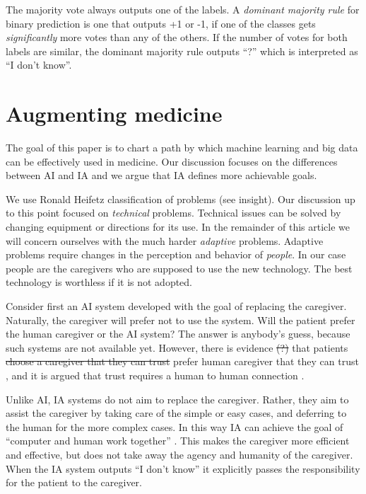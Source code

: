 \documentclass[11pt]{pnas-new}
\begin{document}
The majority vote always outputs one of the labels. A {\em dominant
  majority rule} for binary prediction is one that outputs +1 or -1,
if one of the classes gets {\em significantly} more votes than any of
the others. If the number of votes for both labels are similar, the
dominant majority rule outputs ``?'' which is interpreted as ``I don't
know''.


\section{Augmenting medicine}


The goal of this paper is to chart a path by which machine learning
and big data can be effectively used in medicine. Our discussion
focuses on the differences between AI and IA and we argue that IA
defines more achievable goals.

We use Ronald Heifetz classification of problems (see insight). Our
discussion up to this point focused on {\em technical}
problems. Technical issues can be solved by changing equipment or
directions for its use. In the remainder of this article we will
concern ourselves with the much harder {\em adaptive}
problems. Adaptive problems require changes in the perception and
behavior of {\em people}. In our case people are the caregivers who
are supposed to use the new technology. The best technology is
worthless if it is not adopted.

Consider first an AI system developed with the goal of replacing the
caregiver. Naturally, the caregiver will prefer not to use the
system. Will the patient prefer the human caregiver or the AI system?
The answer is anybody's guess, because such systems are not available
yet. However, there is evidence \sout{(?)} that patients \sout{choose a caregiver
that they can trust}
{\color{blue}prefer human caregiver that they can trust}
\cite{ongena2020patients}, and {\color{blue}it is argued that} trust requires a human to human connection \cite{nundy2019promoting}. 

Unlike AI, IA systems do not aim to replace the caregiver. Rather,
they aim to assist the caregiver by taking care of the simple or easy
cases, and deferring to the human for the more complex cases. In this way IA can 
achieve the goal of ``computer and human work together'' \cite{verghese2018computer}. 
This makes the caregiver more efficient and effective, but does
not take away the agency and humanity of the caregiver. When the IA system outputs
``I don't know'' it explicitly passes the responsibility for the
patient to the caregiver.
\end{document}
